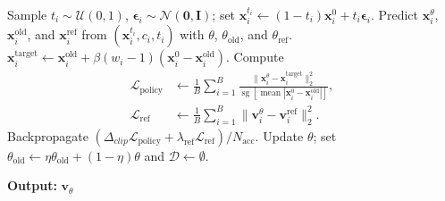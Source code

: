 \documentclass{article} %
\begin{document}
\begin{algorithm}[H]
\begin{algorithmic}[1]
                \State Sample $t_i\sim\mathcal{U}(0,1)$,
                $\boldsymbol{\epsilon}_i\sim\mathcal{N}(\mathbf{0},\mathbf{I})$;
                set $\mathbf{x}_i^{t_i}\leftarrow
                (1-t_i)\mathbf{x}_i^0+t_i\boldsymbol{\epsilon}_i$.
                \State Predict $\mathbf{x}_i^\theta$,
                $\mathbf{x}_i^{\mathrm{old}}$, and $\mathbf{x}_i^{\mathrm{ref}}$
                from $(\mathbf{x}_i^{t_i},c_i,t_i)$ with
                $\theta$, $\theta_{\mathrm{old}}$, and $\theta_{\mathrm{ref}}$.
                \State $\mathbf{x}_i^{\mathrm{target}}\leftarrow
                \mathbf{x}_i^{\mathrm{old}}+
                \beta(w_i-1)(\mathbf{x}_i^0-\mathbf{x}_i^{\mathrm{old}})$.
                \State Compute
                \[
                    \begin{aligned}
                    \mathcal{L}_{\mathrm{policy}}
                    &\leftarrow\frac{1}{B}\sum_{i=1}^{B}
                    \frac{\|\mathbf{x}_i^\theta-\mathbf{x}_i^{\mathrm{target}}\|_2^2}
                    {\operatorname{sg}[\operatorname{mean}
                    |\mathbf{x}_i^0-\mathbf{x}_i^{\mathrm{old}}|]},\\
                    \mathcal{L}_{\mathrm{ref}}
                    &\leftarrow\frac{1}{B}\sum_{i=1}^{B}
                    \|\mathbf{v}_i^\theta-\mathbf{v}_i^{\mathrm{ref}}\|_2^2.
                    \end{aligned}
                \]
                \State Backpropagate
                $(\Delta_{clip}\mathcal{L}_{\mathrm{policy}}+
                \lambda_{\mathrm{ref}}\mathcal{L}_{\mathrm{ref}})/N_{\mathrm{acc}}$.
            \EndFor
            \State Update $\theta$; set
            $\theta_{\mathrm{old}}\leftarrow
            \eta\theta_{\mathrm{old}}+(1-\eta)\theta$ and
            $\mathcal{D}\leftarrow\emptyset$.
        \EndFor
    \end{algorithmic}
    \textbf{Output:} $\mathbf{v}_\theta$
\end{algorithm}
\end{document}
